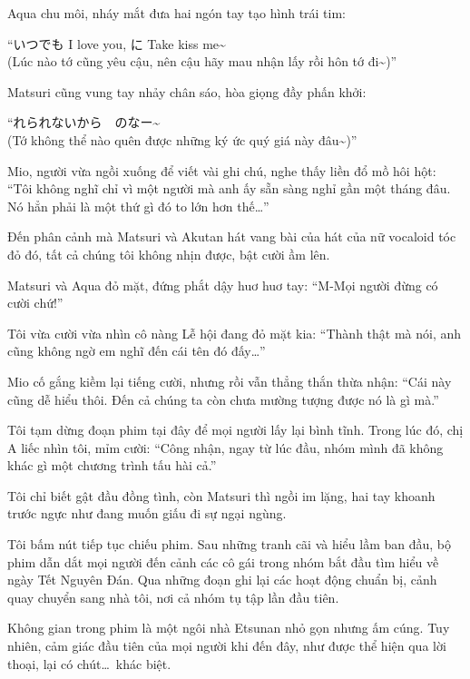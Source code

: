 \documentclass[../main.tex]{subfiles}
\begin{document}
Aqua chu môi, nháy mắt đưa hai ngón tay tạo hình trái tim:

``いつでも I love you, に Take kiss me{\fotskip \~{}} \\ (Lúc nào tớ cũng yêu cậu, nên cậu hãy mau nhận lấy rồi hôn tớ đi\~{})''

Matsuri cũng vung tay nhảy chân sáo, hòa giọng đầy phấn khởi:

``れられないから　のなー{\fotskip \~{}} \\ (Tớ không thể nào quên được những ký ức quý giá này đâu\~{})''

Mio, người vừa ngồi xuống để viết vài ghi chú, nghe thấy liền đổ mồ hôi hột: ``Tôi không nghĩ chỉ vì một người mà anh ấy sẵn sàng nghỉ gần một tháng đâu. Nó hẳn phải là một thứ gì đó to lớn hơn thế\dots''

\il

Đến phân cảnh mà Matsuri và Akutan hát vang bài của hát của nữ vocaloid tóc đỏ đó, tất cả chúng tôi không nhịn được, bật cười ầm lên.

Matsuri và Aqua đỏ mặt, đứng phắt dậy huơ huơ tay: ``M-Mọi người đừng có cười chứ!''

Tôi vừa cười vừa nhìn cô nàng Lễ hội đang đỏ mặt kia: ``Thành thật mà nói, anh cũng không ngờ em nghĩ đến cái tên đó đấy\dots''

Mio cố gắng kiềm lại tiếng cười, nhưng rồi vẫn thẳng thắn thừa nhận: ``Cái này cũng dễ hiểu thôi. Đến cả chúng ta còn chưa mường tượng được nó là gì mà.''

Tôi tạm dừng đoạn phim tại đây để mọi người lấy lại bình tĩnh. Trong lúc đó, chị A liếc nhìn tôi, mỉm cười: ``Công nhận, ngay từ lúc đầu, nhóm mình đã không khác gì một chương trình tấu hài cả.''

Tôi chỉ biết gật đầu đồng tình, còn Matsuri thì ngồi im lặng, hai tay khoanh trước ngực như đang muốn giấu đi sự ngại ngùng.

Tôi bấm nút tiếp tục chiếu phim. Sau những tranh cãi và hiểu lầm ban đầu, bộ phim dẫn dắt mọi người đến cảnh các cô gái trong nhóm bắt đầu tìm hiểu về ngày Tết Nguyên Đán. Qua những đoạn ghi lại các hoạt động chuẩn bị, cảnh quay chuyển sang nhà tôi, nơi cả nhóm tụ tập lần đầu tiên.

Không gian trong phim là một ngôi nhà Etsunan nhỏ gọn nhưng ấm cúng. Tuy nhiên, cảm giác đầu tiên của mọi người khi đến đây, như được thể hiện qua lời thoại, lại có chút\dots\ khác biệt.
\end{document}
